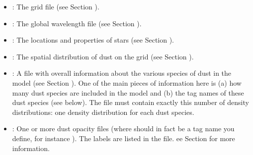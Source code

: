 \documentclass[letterpaper,10pt,english]{sphinxmanual}
\begin{document}
\begin{itemize}
\item {} 
: The grid file (see Section {\hyperref[\detokenize{inputoutputfiles:sec-grid-input}]{}}).

\item {} 
: The global wavelength file (see Section
{\hyperref[\detokenize{inputoutputfiles:sec-wavelengths}]{}}).

\item {} 
: The locations and properties of stars (see Section
{\hyperref[\detokenize{inputoutputfiles:sec-stars}]{}}).

\item {} 
: The spatial distribution of dust on the grid (see
Section {\hyperref[\detokenize{inputoutputfiles:sec-dustdens}]{}}).

\item {} 
: A file with overall information about the various species of
dust in the model (see Section {\hyperref[\detokenize{inputoutputfiles:sec-opacities}]{}}).  One of the main pieces
of information here is (a) how many dust species are included in the model
and (b) the tag names of these dust species (see 
below). The file  must contain exactly this number of
density distributions: one density distribution for each dust species.

\item {} 
: One or more dust opacity files (where  should in
fact be a tag name you define, for instance ). The
labels are listed in the  file. ee Section
{\hyperref[\detokenize{inputoutputfiles:sec-opacities}]{}} for more information.


\end{itemize}
\end{document}
